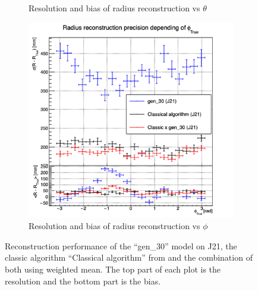 \documentclass[../main.tex]{subfiles}
\begin{document}
\begin{figure}[ht]
\begin{subfigure}[t]{0.32\linewidth}
    \caption{Resolution and bias of radius reconstruction vs $\theta$}
    \label{fig:jcnn:vic_cnn:multi_vic_cnn_Cx30_MSBvTTC}
  \end{subfigure}
  \begin{subfigure}[t]{0.32\linewidth}
    \centering
    \includegraphics[width=\linewidth]{images/jcnn/vic_cnn/multi_vic_cnn_Cx30_MSBvPTC.png}
    \caption{Resolution and bias of radius reconstruction vs $\phi$}
    \label{fig:jcnn:vic_cnn:multi_vic_cnn_Cx30_MSBvPTC}
  \end{subfigure}
  \caption{Reconstruction performance of the ``gen\_30'' model on J21, the classic algorithm ``Classical algorithm'' from \cite{lebrin_towards_2022} and the combination of both using weighted mean. The top part of each plot is the resolution and the bottom part is the bias.}

  \label{fig:jcnn:vic_cnn:Cx30}
\end{figure}
\end{document}
